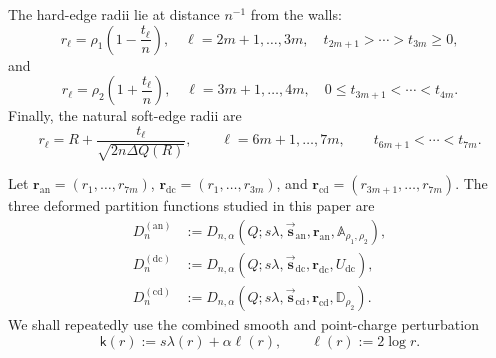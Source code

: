 \documentclass[a4paper]{article}
\numberwithin{equation}{section}
\begin{document}
The hard-edge radii lie at distance $n^{-1}$ from the walls:
\begin{equation}
\label{def of merging radii inside hard}
r_\ell=\rho_1\left(1-\frac{t_\ell}{n}\right),
\quad \ell=2m+1,\ldots,3m,
\quad t_{2m+1}>\cdots>t_{3m}\geq0,
\end{equation}
and
\begin{equation}
\label{def of merging radii outside hard}
r_\ell=\rho_2\left(1+\frac{t_\ell}{n}\right),
\quad \ell=3m+1,\ldots,4m,
\quad 0\leq t_{3m+1}<\cdots<t_{4m}.
\end{equation}
Finally, the natural soft-edge radii are
\begin{equation}
\label{def of merging radii soft edge}
r_\ell=R+\frac{t_\ell}{\sqrt{2n\Delta Q(R)}},
\qquad \ell=6m+1,\ldots,7m,
\qquad t_{6m+1}<\cdots<t_{7m}.
\end{equation}


Let $\boldsymbol r_{\mathrm{an}}=(r_1,\ldots,r_{7m})$, $\boldsymbol r_{\mathrm{dc}}=(r_1,\ldots,r_{3m})$, and $\boldsymbol r_{\mathrm{cd}}=(r_{3m+1},\ldots,r_{7m})$.  The three deformed partition functions studied in this paper are
\begin{align}
\label{def of Dnc annulus}
D_n^{(\mathrm{an})}
&:=D_{n,\alpha}(Q;s\lambda,\vec{\boldsymbol s}_{\mathrm{an}},\boldsymbol r_{\mathrm{an}},\mathbb A_{\rho_1,\rho_2}),
\\
\label{def of Dnc disk complement}
D_n^{(\mathrm{dc})}
&:=D_{n,\alpha}(Q;s\lambda,\vec{\boldsymbol s}_{\mathrm{dc}},\boldsymbol r_{\mathrm{dc}},U_{\mathrm{dc}}),
\\
\label{def of Dnc centered disk}
D_n^{(\mathrm{cd})}
&:=D_{n,\alpha}(Q;s\lambda,\vec{\boldsymbol s}_{\mathrm{cd}},\boldsymbol r_{\mathrm{cd}},\mathbb D_{\rho_2}).
\end{align}
We shall repeatedly use the combined smooth and point-charge perturbation
\begin{equation}
\label{def of mathsfkr}
\mathsf k(r):=s\lambda(r)+\alpha\ell(r),
\qquad \ell(r):=2\log r.
\end{equation}
\end{document}
